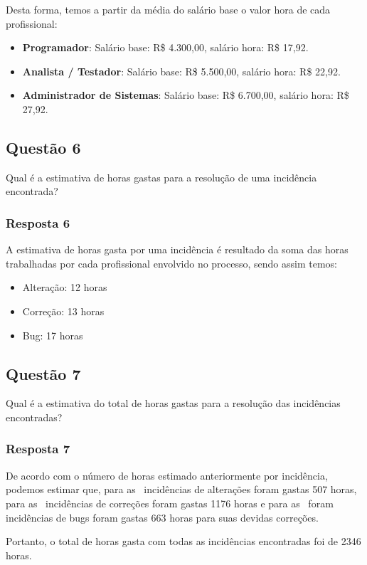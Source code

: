 \documentclass[11pt, a4paper]{article}
\begin{document}
Desta forma, temos a partir da média do salário base o valor hora de cada profissional:

\begin{itemize}
	\item \textbf{Programador}: Salário base: R\$ 4.300,00, salário hora: R\$ 17,92.
	\item \textbf{Analista / Testador}: Salário base: R\$ 5.500,00, salário hora: R\$ 22,92.
	\item \textbf{Administrador de Sistemas}: Salário base: R\$ 6.700,00, salário hora: R\$ 27,92.
\end{itemize}

\subsection{Questão 6}
Qual é a estimativa de horas gastas para a resolução de uma incidência encontrada?

\subsubsection{Resposta 6}
A estimativa de horas gasta por uma incidência é resultado da soma das horas trabalhadas por cada profissional envolvido no processo, sendo assim temos:

\begin{itemize}
	\item Alteração: 12 horas
	\item Correção: 13 horas
	\item Bug: 17 horas
\end{itemize}

\subsection{Questão 7}
Qual é a estimativa do total de horas gastas para a resolução das incidências encontradas?

\subsubsection{Resposta 7}
De acordo com o número de horas estimado anteriormente por incidência, podemos estimar que, para as \alteracoes~incidências de alterações foram gastas 507 horas, para as \correcoes~incidências de correções foram gastas 1176 horas e para as \bugs~foram incidências de bugs foram gastas 663 horas para suas devidas correções.

Portanto, o total de horas gasta com todas as incidências encontradas foi de 2346 horas.
\end{document}
